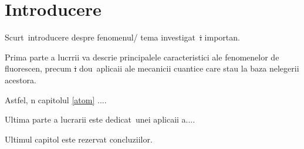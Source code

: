 \chapter{Introducere}
\label{intro}

\indent

\par


 
Scurt\ab\  introducere despre fenomenul/ tema investigat\ab\ \st i importan\tb \ab.
 
		 
		 
		Prima parte a lucr\ab rii va descrie principalele caracteristici ale fenomenelor de fluorescen\tb \ab, precum \st i dou\ab \ aplica\tb ii              ale mecanicii cuantice care stau la baza \ib n\tb elegerii acestora.
		
 		 Astfel, \ib n capitolul \ref{atom} ....
 		 
 		 
  		Ultima parte a lucrarii este dedicat\ab \ unei aplica\tb ii a....
  		
	Ultimul capitol este rezervat concluziilor.
  
  